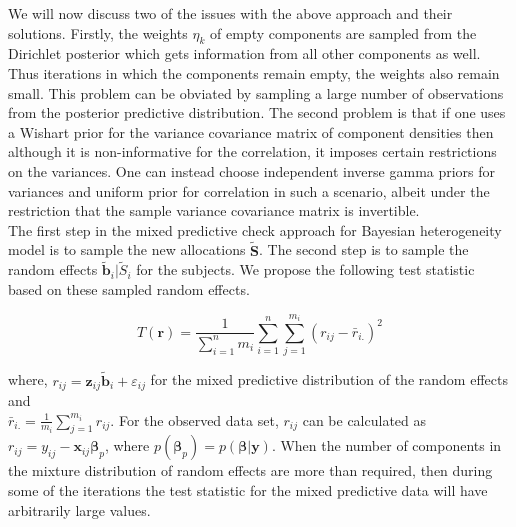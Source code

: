 We will now discuss two of the issues with the above approach and their solutions. Firstly, the weights $\eta_k$ of empty components are sampled from the Dirichlet posterior which gets information from all other components as well. Thus iterations in which the components remain empty, the weights also remain small. This problem can be obviated by sampling a large number of observations from the posterior predictive distribution. The second problem is that if one uses a Wishart prior for the variance covariance matrix of component densities then although it is non-informative for the correlation, it imposes certain restrictions on the variances. One can instead choose independent inverse gamma priors for variances and uniform prior for correlation in such a scenario, albeit under the restriction that the sample variance covariance matrix is invertible.\\

 The first step in the mixed predictive check approach for Bayesian heterogeneity model is to sample the new allocations $\boldsymbol{\tilde{S}}$. The second step is to sample the random effects $\boldsymbol{\tilde{b}}_i|\tilde{S}_i$ for the subjects. We propose the following test statistic based on these sampled random effects.

\begin{equation}
\label{eq : ppc_test_statistic}
T(\boldsymbol{r}) = \frac 1 {\sum_{i=1}^n m_i} \sum_{i=1}^n \sum_{j=1}^{m_i} {(r_{ij}-\bar{r}_{i.})}^2
\end{equation}

where, $r_{ij} = \boldsymbol{z}_{ij}\boldsymbol{\tilde{b}}_i + \varepsilon_{ij}$ for the mixed predictive distribution of the random effects and\\ $\bar{r}_{i.} = \frac 1 {m_i} \sum_{j=1}^{m_i} r_{ij}$. For the observed data set, $r_{ij}$ can be calculated as $r_{ij} = y_{ij} - \boldsymbol{x}_{ij}\boldsymbol{\beta}_p$, where $p(\boldsymbol{\beta}_p) = p(\boldsymbol{\beta}|\boldsymbol{y})$. When the number of components in the mixture distribution of random effects are more than required, then during some of the iterations the test statistic for the mixed predictive data will have arbitrarily large values.

